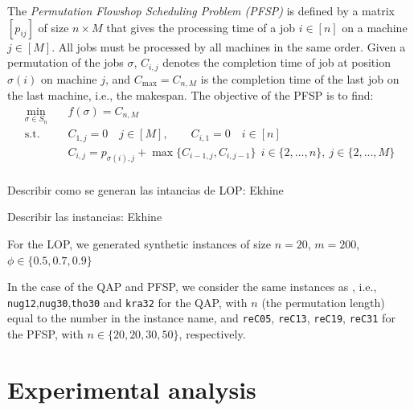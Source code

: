 \documentclass[runningheads]{llncs}
\begin{document}
The \emph{Permutation Flowshop Scheduling Problem (PFSP)} is defined by a matrix $[p_{ij}]$ of size $n \times M$ that gives the processing time of a job $i \in [n]$ on a machine $j \in [M]$. All jobs must be processed by all machines in the same order. Given a permutation of the jobs $\sigma$, $C_{i,j}$ denotes the completion time of job at position $\sigma(i)$ on machine $j$, and $C_{\max} = C_{n,M}$  is the completion time of the last job on the last machine, i.e., the makespan. The objective of the PFSP is to find:
\begin{equation}\label{eq:qap}
  \begin{split}
    \min_{\sigma \in S_n}\quad& f(\sigma) = C_{n,M}\\
    \text{s.t.}\quad & C_{1,j} = 0 \quad j\in [M], \qquad C_{i,1} = 0\quad i \in [n]\\
    &C_{i,j} = p_{\sigma(i),j} + \max\{C_{i-1, j}, C_{i, j-1}\}  \ \  i \in \{2,\dotsc,n\},\ j \in\{2,\dotsc, M\}\\
\end{split}
\end{equation}


Describir como se generan las intancias de LOP: Ekhine

Describir las instancias: Ekhine

For the LOP, we generated synthetic instances of size $n=20$, $m=200$, $\phi\in\{0.5,0.7,0.9\}$

In the case of the QAP and PFSP, we consider the same instances as
\citet{ZaeStoFriFisNauBar2014,ZaeStoBar2014:ppsn}, i.e.,
\texttt{nug12},\texttt{nug30},\texttt{tho30} and \texttt{kra32} for the QAP,
with $n$ (the permutation length) equal to the number in the instance name, and \texttt{reC05},
\texttt{reC13}, \texttt{reC19}, \texttt{reC31} for the PFSP, with
$n \in \{20, 20, 30, 50\}$, respectively.

\section{Experimental analysis}

\end{document}
